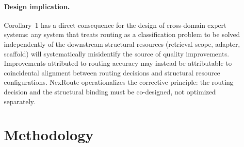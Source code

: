 \documentclass[a4paper,fleql,doubleblind]{cas-sc}
\begin{document}
\paragraph{Design implication.}
Corollary~1 has a direct consequence for the design of cross-domain expert systems:
any system that treats routing as a classification problem to be solved independently
of the downstream structural resources (retrieval scope, adapter, scaffold) will
systematically misidentify the source of quality improvements.
Improvements attributed to routing accuracy may instead be attributable to coincidental
alignment between routing decisions and structural resource configurations.
NexRoute operationalizes the corrective principle: the routing decision and the
structural binding must be co-designed, not optimized separately.

\section{Methodology}
\label{sec:method}

\end{document}
